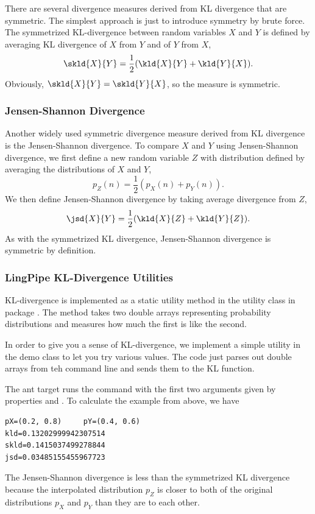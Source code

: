 There are several divergence measures derived from KL divergence that
are symmetric.  The simplest approach is just to introduce symmetry
by brute force.  The symmetrized KL-divergence between random variables
$X$ and $Y$ is defined by averaging KL divergence of $X$ from $Y$
and of $Y$ from $X$,
%
\begin{equation}
\skld{X}{Y} = \frac{1}{2}(\kld{X}{Y} + \kld{Y}{X}).
\end{equation}
%
Obviously, $\skld{X}{Y} = \skld{Y}{X}$, so the measure is symmetric.


\subsubsection{Jensen-Shannon Divergence}

Another widely used symmetric divergence measure derived from KL divergence
is the Jensen-Shannon divergence.  To compare $X$ and $Y$ using Jensen-Shannon
divergence, we first define a new random variable $Z$ with distribution defined by
averaging the distributions of $X$ and $Y$,
%
\[
p_Z(n) = \frac{1}{2}(p_X(n) + p_Y(n)).
\]
%
We then define Jensen-Shannon divergence by taking average divergence
from $Z$,
%
\begin{equation}
\jsd{X}{Y} = \frac{1}{2}(\kld{X}{Z} + \kld{Y}{Z}).
\end{equation}
%
As with the symmetrized KL divergence, Jensen-Shannon divergence is
symmetric by definition.


\subsubsection{LingPipe KL-Divergence Utilities}

KL-divergence is implemented as a static utility method in the
 utility class in package .
The method takes two double arrays representing probability
distributions and measures how much the first is like the second.

In order to give you a sense of KL-divergence, we implement a simple
utility in the demo class  to let you try various
values.  The code just parses out double arrays from teh command line
and sends them to the KL function.
%

The ant target  runs the command with the first two arguments
given by properties  and .  To calculate the example
from above, we have
%
\begin{verbatim}
pX=(0.2, 0.8)     pY=(0.4, 0.6)     
kld=0.13202999942307514    
skld=0.1415037499278844   
jsd=0.03485155455967723
\end{verbatim}
%
The Jensen-Shannon divergence is less than the symmetrized KL
divergence because the interpolated distribution $p_Z$ is closer to
both of the original distributions $p_X$ and $p_Y$ than they are to
each other.

